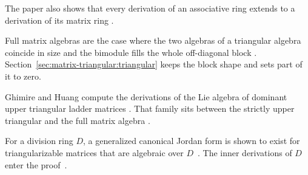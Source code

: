 The paper also shows that every derivation of an associative ring extends to a
derivation of its matrix ring \cite[p.~1]{AyupovArzikulov2013}.

Full matrix algebras are the case where the two algebras of a triangular
algebra coincide in size and the bimodule fills the whole off-diagonal block
\cite[p.~119]{Cheung2001}. Section~\ref{sec:matrix-triangular:triangular}
keeps the block shape and sets part of it to zero.

Ghimire and Huang compute the derivations of the Lie algebra of dominant upper
triangular ladder matrices \cite[Abstract, p.~1]{GhimireHuang2015}. That
family sits between the strictly upper triangular and the full matrix algebra
\cite[Abstract, p.~1]{GhimireHuang2015}.

For a division ring $D$, a generalized canonical Jordan form is shown to exist
for triangularizable matrices that are algebraic over $D$~\cite{WlInnerDerivationsOfDivisionRing2018}. The inner
derivations of $D$ enter the
proof~\cite{WlInnerDerivationsOfDivisionRing2018}.
